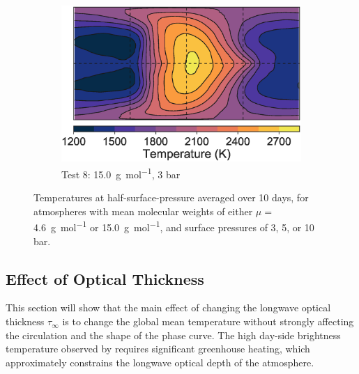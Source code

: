 \begin{figure}
\begin{subfigure}[t]{0.33\textwidth}
    \includegraphics[width=\textwidth]{figures/linking-climate-55cnce/15GMOL_3_halfp.eps}
    \caption{Test 8: \SI{15.0}{\gram\per\mole}, 3 bar}
    \label{fig:free-h-shear}
  \end{subfigure}
  \caption{Temperatures at half-surface-pressure averaged over 10 days, for atmospheres with mean molecular weights of either $\mu =$ \SI{4.6}{\gram\per\mole} or \SI{15.0}{\gram\per\mole}, and surface pressures of 3, 5, or 10 bar.}
  \label{fig:H2N2_T_maps}
\end{figure}

\subsection{Effect of Optical Thickness}\label{sec:tauinf_effect}

This section will show that the main effect of changing the longwave optical thickness $\tau_{\infty}$ is to change the global mean temperature without strongly affecting the circulation and the shape of the phase curve. The high day-side brightness temperature observed by  \citet{demory201655cnce} requires significant greenhouse heating, which approximately constrains the longwave optical depth of the atmosphere.

